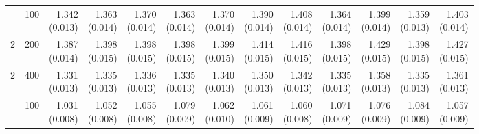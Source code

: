 \begin{table}[p]
{\begin{tabular}{llrrrrrrrrrrr}
\addlinespace
2 & 100 & \shortstack{1.342\\(0.013)} & \shortstack{1.363\\(0.014)} & \shortstack{1.370\\(0.014)} & \shortstack{1.363\\(0.014)} & \shortstack{1.370\\(0.014)} & \shortstack{1.390\\(0.014)} & \shortstack{1.408\\(0.014)} & \shortstack{1.364\\(0.014)} & \shortstack{1.399\\(0.014)} & \shortstack{1.359\\(0.013)} & \shortstack{1.403\\(0.014)} \\
2 & 200 & \shortstack{1.387\\(0.014)} & \shortstack{1.398\\(0.015)} & \shortstack{1.398\\(0.015)} & \shortstack{1.398\\(0.015)} & \shortstack{1.399\\(0.015)} & \shortstack{1.414\\(0.015)} & \shortstack{1.416\\(0.015)} & \shortstack{1.398\\(0.015)} & \shortstack{1.429\\(0.015)} & \shortstack{1.398\\(0.015)} & \shortstack{1.427\\(0.015)} \\
2 & 400 & \shortstack{1.331\\(0.013)} & \shortstack{1.335\\(0.013)} & \shortstack{1.336\\(0.013)} & \shortstack{1.335\\(0.013)} & \shortstack{1.340\\(0.013)} & \shortstack{1.350\\(0.013)} & \shortstack{1.342\\(0.013)} & \shortstack{1.335\\(0.013)} & \shortstack{1.358\\(0.013)} & \shortstack{1.335\\(0.013)} & \shortstack{1.361\\(0.013)} \\
\addlinespace
3 & 100 & \shortstack{1.031\\(0.008)} & \shortstack{1.052\\(0.008)} & \shortstack{1.055\\(0.008)} & \shortstack{1.079\\(0.009)} & \shortstack{1.062\\(0.010)} & \shortstack{1.061\\(0.009)} & \shortstack{1.060\\(0.008)} & \shortstack{1.071\\(0.009)} & \shortstack{1.076\\(0.009)} & \shortstack{1.084\\(0.009)} & \shortstack{1.057\\(0.009)} \\

\end{tabular}}
\end{table}
